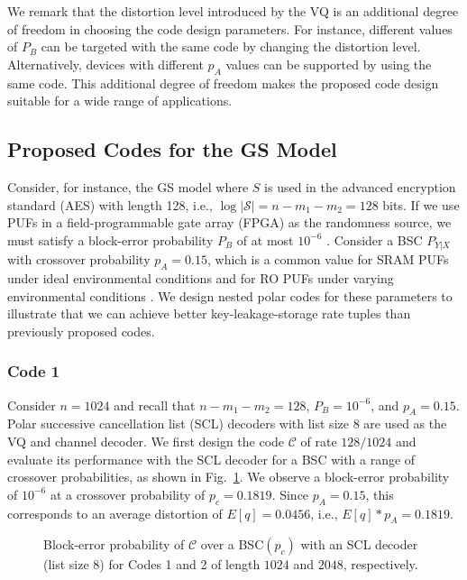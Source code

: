 \documentclass[journal,10pt,twoside]{IEEEtran}
\begin{document}
We remark that the distortion level introduced by the VQ is an additional degree of freedom in choosing the code design parameters. For instance, different values of $P_B$ can be targeted with the same code by changing the distortion level. Alternatively, devices with different $p_A$ values can be supported by using the same code. This additional degree of freedom makes the proposed code design suitable for a wide range of applications. 

\subsection{Proposed Codes for the GS Model}
Consider, for instance, the GS model where $S$ is used in the advanced encryption standard (AES) with length 128, i.e., $\log|\mathcal{S}|=n-m_1-m_2=128$ bits. If we use PUFs in a field-programmable gate array (FPGA) as the randomness source, we must satisfy a block-error probability $P_B$ of at most $10^{-6}$ \cite{FPGAPUF}. Consider a BSC $P_{Y|X}$ with crossover probability $p_A=0.15$, which is a common value for SRAM PUFs under ideal environmental conditions \cite{maes2009soft} and for RO PUFs under varying environmental conditions \cite{bizimtemperature}. We design nested polar codes for these parameters to illustrate that we can achieve better key-leakage-storage rate tuples than previously proposed codes. 

\subsubsection*{Code 1} Consider $n=1024$ and recall that $n-m_1-m_2=128$, $P_B=10^{-6}$, and $p_A=0.15$. Polar successive cancellation list (SCL) decoders with list size $8$ are used as the VQ and channel decoder. We first design the code $\mathcal{C}$ of rate $128/1024$ and evaluate its performance with the SCL decoder for a BSC with a range of crossover probabilities, as shown in Fig.~\ref{fig:n10242048comb}. We observe a block-error probability of $10^{-6}$ at a crossover probability of $p_c=0.1819$. Since $p_A=0.15$, this corresponds to an average distortion of $E[q]=0.0456$, i.e., $E[q]*p_A=0.1819$.

\begin{figure}[t]
	
	\caption{Block-error probability of $\mathcal{C}$ over a BSC$(p_c)$ with an SCL decoder (list size 8) for Codes 1 and 2 of length $1024$ and $2048$, respectively.}
	\label{fig:n10242048comb}
\end{figure}
\end{document}
